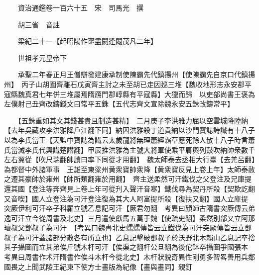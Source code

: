 










 


 
 


 

  
  
  
  
  





  
  
  
  
  
 
  

  

  
  
  



  

 
 

  
   




  

  
  


  　　資治通鑑卷一百六十五　宋　司馬光　撰

　　胡三省　音註

　　梁紀二十一【起昭陽作噩盡閼逢閹茂凡二年】

　　世祖孝元皇帝下

　　承聖二年春正月王僧辯發建康承制使陳霸先代鎮揚州【使陳霸先自京口代鎮揚州】　丙子山胡圍齊離石戊寅齊主討之未至胡已走因廵三堆【魏收地形志永安郡平寇縣魏真君七年併三堆屬焉隋鴈門郡崞縣有平寇縣】大獵而歸　以吏部尚書王褒為左僕射己丑齊改鑄錢文曰常平五銖【五代志齊文宣除魏永安五銖改鑄常平】

　　【五銖重如其文其錢甚貴且制造甚精】　二月庚子李洪雅力屈以空雲城降陸納【去年吳藏攻李洪雅降戶江翻下同】納囚洪雅殺丁道貴納以沙門寶誌詩䜟有十八子以為李氏當王【天監中寶誌為䜟云太歲龍將無理蕭經霜草應死餘人散十八子時言蕭氏當滅李氏代興䜟楚譛翻】甲辰推洪雅為主號大將軍使乘平肩輿列鼓吹納帥衆數千左右翼從【吹尺瑞翻帥讀曰率下同從才用翻】　魏太師泰去丞相大行臺【去羌呂翻】為都督中外諸軍事　王雄至東梁州黄衆寶帥衆降【黄衆寶反見上卷上年】太師泰赦之遷其豪帥於雍州【帥所類翻雍於用翻】　齊主送柔然可汗鐵伐之父登注及兄庫提還其國【登注等奔齊見上卷上年可從刋入聲汗音寒】鐵伐尋為契丹所殺【契欺訖翻又音喫】國人立登注為可汗登注復為其大人阿富提所殺【復扶又翻】國人立庫提　突厥伊利可汗卒子科羅立號乙息記可汗【厥君勿翻　考異曰顔師古隋書突厥傳云弟逸可汗立今從周書及北史】三月遣使獻馬五萬于魏【使疏吏翻】柔然别部又立阿那瓌叔父鄧叔子為可汗　【考異曰魏書北史蠕蠕傳皆云立鐵伐為可汗突厥傳皆云立鄧叔子為可汗蓋諸部分散各有所立也】乙息記撃破鄧叔子於沃野北木賴山乙息記卒捨其子攝圖而立其弟俟斤號木杆可汗【俟渠之翻杆公旦翻為後佗鉢卒攝圖爭國張本　考異曰周書作术汗隋書作俟斗木杆今從北史】木杆狀貌奇異性剛勇多智畧善用兵鄰國畏之上聞武陵王紀東下使方士畫版為紀像【畫與畫同】親釘


